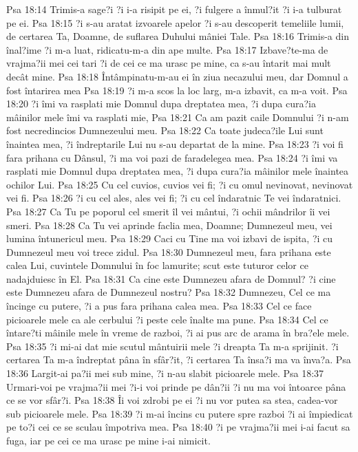 Psa 18:14  Trimis-a sage?i ?i i-a risipit pe ei, ?i fulgere a înmul?it ?i i-a tulburat pe ei.
Psa 18:15  ?i s-au aratat izvoarele apelor ?i s-au descoperit temeliile lumii, de certarea Ta, Doamne, de suflarea Duhului mâniei Tale.
Psa 18:16  Trimis-a din înal?ime ?i m-a luat, ridicatu-m-a din ape multe.
Psa 18:17  Izbave?te-ma de vrajma?ii mei cei tari ?i de cei ce ma urasc pe mine, ca s-au întarit mai mult decât mine.
Psa 18:18  Întâmpinatu-m-au ei în ziua necazului meu, dar Domnul a fost întarirea mea
Psa 18:19  ?i m-a scos la loc larg, m-a izbavit, ca m-a voit.
Psa 18:20  ?i îmi va rasplati mie Domnul dupa dreptatea mea, ?i dupa cura?ia mâinilor mele îmi va rasplati mie,
Psa 18:21  Ca am pazit caile Domnului ?i n-am fost necredincios Dumnezeului meu.
Psa 18:22  Ca toate judeca?ile Lui sunt înaintea mea, ?i îndreptarile Lui nu s-au departat de la mine.
Psa 18:23  ?i voi fi fara prihana cu Dânsul, ?i ma voi pazi de faradelegea mea.
Psa 18:24  ?i îmi va rasplati mie Domnul dupa dreptatea mea, ?i dupa cura?ia mâinilor mele înaintea ochilor Lui.
Psa 18:25  Cu cel cuvios, cuvios vei fi; ?i cu omul nevinovat, nevinovat vei fi.
Psa 18:26  ?i cu cel ales, ales vei fi; ?i cu cel îndaratnic Te vei îndaratnici.
Psa 18:27  Ca Tu pe poporul cel smerit îl vei mântui, ?i ochii mândrilor îi vei smeri.
Psa 18:28  Ca Tu vei aprinde faclia mea, Doamne; Dumnezeul meu, vei lumina întunericul meu.
Psa 18:29  Caci cu Tine ma voi izbavi de ispita, ?i cu Dumnezeul meu voi trece zidul.
Psa 18:30  Dumnezeul meu, fara prihana este calea Lui, cuvintele Domnului în foc lamurite; scut este tuturor celor ce nadajduiesc în El.
Psa 18:31  Ca cine este Dumnezeu afara de Domnul? ?i cine este Dumnezeu afara de Dumnezeul nostru?
Psa 18:32  Dumnezeu, Cel ce ma încinge cu putere, ?i a pus fara prihana calea mea.
Psa 18:33  Cel ce face picioarele mele ca ale cerbului ?i peste cele înalte ma pune.
Psa 18:34  Cel ce întare?ti mâinile mele în vreme de razboi, ?i ai pus arc de arama în bra?ele mele.
Psa 18:35  ?i mi-ai dat mie scutul mântuirii mele ?i dreapta Ta m-a sprijinit. ?i certarea Ta m-a îndreptat pâna în sfâr?it, ?i certarea Ta însa?i ma va înva?a.
Psa 18:36  Largit-ai pa?ii mei sub mine, ?i n-au slabit picioarele mele.
Psa 18:37  Urmari-voi pe vrajma?ii mei ?i-i voi prinde pe dân?ii ?i nu ma voi întoarce pâna ce se vor sfâr?i.
Psa 18:38  Îi voi zdrobi pe ei ?i nu vor putea sa stea, cadea-vor sub picioarele mele.
Psa 18:39  ?i m-ai încins cu putere spre razboi ?i ai împiedicat pe to?i cei ce se sculau împotriva mea.
Psa 18:40  ?i pe vrajma?ii mei i-ai facut sa fuga, iar pe cei ce ma urasc pe mine i-ai nimicit.
